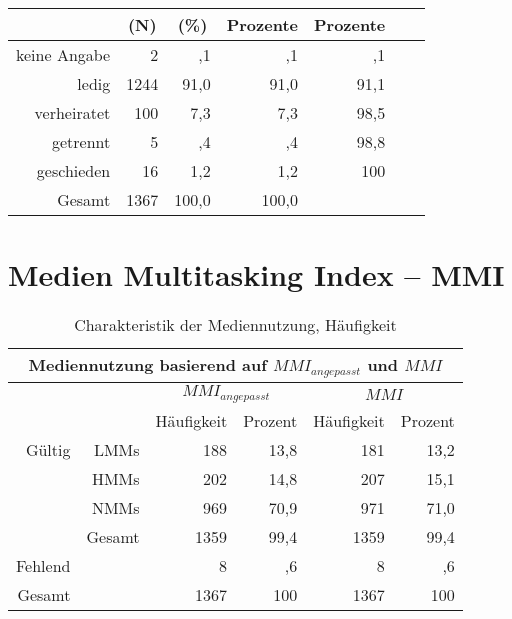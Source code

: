 \begin{RaggedRight}
\begin{table}[ht]
\begin{tabular}[t]{|r|r|r|r|r|r|r|}
        \multicolumn{1}{|c}{} & \multicolumn{1}{c|}{(N)} & \multicolumn{1}{|c|}{(\%)} & \multicolumn{1}{|c|}{Prozente} & \multicolumn{1}{|c|}{Prozente} \\
        \hline
        keine Angabe & 2 & ,1 & ,1 & ,1\\
        ledig & 1244 & 91,0 & 91,0 & 91,1\\
        verheiratet & 100 & 7,3 & 7,3 & 98,5\\
        getrennt & 5 & ,4 & ,4 & 98,8\\
        geschieden & 16 & 1,2 & 1,2 & 100\\
        Gesamt  & 1367 & 100,0 & 100,0 & \\
        \hline
    \end{tabular}
    \label{table.sozidemoZivil}
\end{table}
\end{RaggedRight}

\section{Medien Multitasking Index -- MMI}\label{anhangHaeufigkeit.mmi}
\begin{table}[H] 
    \centering
    \caption{Charakteristik der Mediennutzung, Häufigkeit}
    \begin{tabular}[t]{|r r|r|r|r|r|} 
        \hline
        \multicolumn{6}{|c|}{\textbf{Mediennutzung basierend auf $MMI_{angepasst}$ und $MMI$}}\\ 
        \hline       
        \multicolumn{2}{|c}{} & \multicolumn{2}{c|}{$MMI_{angepasst}$} & \multicolumn{2}{c|}{$MMI$}\\
        \multicolumn{2}{|c}{} & \multicolumn{1}{c|}{Häufigkeit} & \multicolumn{1}{c|}{Prozent}&\multicolumn{1}{c|}{Häufigkeit} & \multicolumn{1}{c|}{Prozent}\\
        \hline
        Gültig & LMMs & 188 & 13,8 & 181 & 13,2\\
        & HMMs & 202 & 14,8 & 207 & 15,1\\
        & NMMs & 969 & 70,9 & 971 & 71,0\\
        &Gesamt & 1359 & 99,4 & 1359 & 99,4\\
        Fehlend & & 8 & ,6 & 8 & ,6\\
        Gesamt & & 1367 & 100 & 1367 & 100\\
        \hline
    \end{tabular}
    \label{table.deskrptMeediennutzung}
\end{table}

